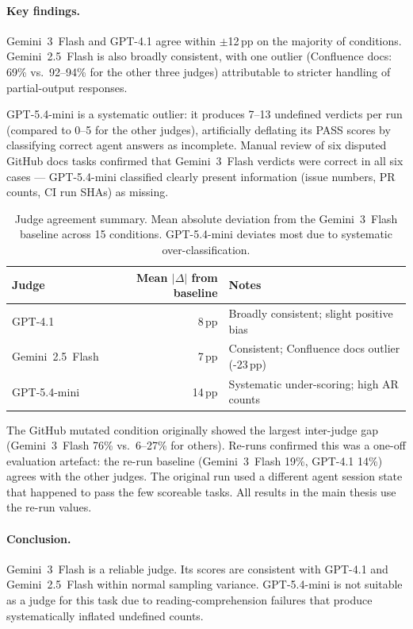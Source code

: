 \paragraph{Key findings.}
Gemini~3~Flash and GPT-4.1 agree within $\pm$12\,pp on the majority of conditions. Gemini~2.5~Flash is also broadly consistent, with one outlier (Confluence docs: 69\% vs.\ 92--94\% for the other three judges) attributable to stricter handling of partial-output responses.

GPT-5.4-mini is a systematic outlier: it produces 7--13  undefined verdicts per run (compared to 0--5 for the other judges), artificially deflating its PASS scores by classifying correct agent answers as incomplete. Manual review of six disputed GitHub docs tasks confirmed that Gemini~3~Flash verdicts were correct in all six cases --- GPT-5.4-mini classified clearly present information (issue numbers, PR counts, CI run SHAs) as missing.

\begin{table}[htbp]
  \centering
  \caption{Judge agreement summary. Mean absolute deviation from the Gemini~3~Flash baseline across 15 conditions. GPT-5.4-mini deviates most due to systematic  over-classification.}
  \label{tab:apx:judge_summary}
  \small
  \begin{tabular}{lrl}
    \toprule
    \textbf{Judge} & \textbf{Mean $|\Delta|$ from baseline} & \textbf{Notes} \\
    \midrule
    GPT-4.1         & 8\,pp & Broadly consistent; slight positive bias \\
    Gemini~2.5~Flash & 7\,pp & Consistent; Confluence docs outlier (-23\,pp) \\
    GPT-5.4-mini    & 14\,pp & Systematic under-scoring; high AR counts \\
    \bottomrule
  \end{tabular}
\end{table}

The GitHub mutated condition originally showed the largest inter-judge gap (Gemini~3~Flash 76\% vs.\ 6--27\% for others). Re-runs confirmed this was a one-off evaluation artefact: the re-run baseline (Gemini~3~Flash 19\%, GPT-4.1 14\%) agrees with the other judges. The original run used a different agent session state that happened to pass the few scoreable tasks. All results in the main thesis use the re-run values.

\paragraph{Conclusion.}
Gemini~3~Flash is a reliable judge. Its scores are consistent with GPT-4.1 and Gemini~2.5~Flash within normal sampling variance. GPT-5.4-mini is not suitable as a judge for this task due to reading-comprehension failures that produce systematically inflated  undefined counts.

